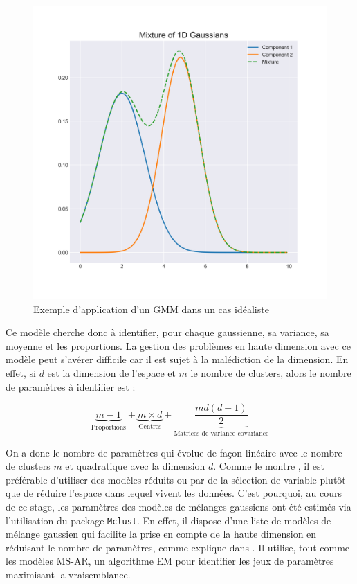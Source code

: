 \documentclass[12pt]{report}
\begin{document}

\begin{figure}[ht]
\centering
\includegraphics[width=0.5\linewidth]{Images/Models/GMM/GMM_toyexemple}
\caption{Exemple d'application d'un GMM dans un cas idéaliste }
\label{fig:fig:GMM_ToyEx}
\end{figure}



Ce modèle cherche donc à identifier, pour chaque gaussienne, sa variance, sa moyenne et les proportions. La gestion des problèmes en haute dimension avec ce modèle peut s'avérer difficile car il est sujet à la malédiction de la dimension. En effet, si $d$ est la dimension de l'espace et $m$ le nombre de clusters, alors le nombre de paramètres à identifier est :

\begin{equation}
	\underbrace{m-1}_\text{Proportions}  + \underbrace{m \times d}_\text{Centres}  +  \underbrace{\frac{md \left(d - 1\right)}{2}}_\text{Matrices de variance covariance}
	\label{eq:Model_GMM_ParamNumber} 
\end{equation}

On a donc le nombre de paramètres qui évolue de façon linéaire avec le nombre de clusters $m$ et quadratique avec la dimension $d$. Comme le montre \cite{bouveyron_model-based_2014}, il est préférable d'utiliser des modèles réduits ou par de la sélection de variable plutôt que de réduire l'espace dans lequel vivent les données. C'est pourquoi, au cours de ce stage, les paramètres des modèles de mélanges gaussiens ont été estimés via l'utilisation du package \texttt{Mclust}. En effet, il dispose d'une liste de modèles de mélange gaussien qui facilite la prise en compte de la haute dimension en réduisant le nombre de paramètres, comme explique dans \cite{scrucca_mclust_2016}. Il utilise, tout comme les modèles MS-AR, un algorithme EM pour identifier les jeux de paramètres maximisant la vraisemblance. 
\end{document}
